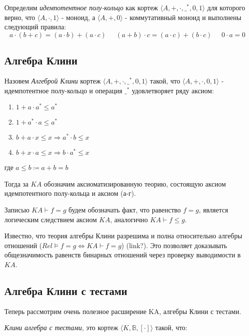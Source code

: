 \documentclass[times
              ]{itmo-student-thesis}
\begin{document}
      Определим \textit{идемпотентное полу-кольцо} как кортеж $ \langle A,+,\cdot,\_^*,0,1 \rangle$ для которого верно, что
      $ \langle A, \cdot, 1 \rangle $ - моноид,
      а $ \langle A, +, 0 \rangle $ - коммутативный моноид и выполнены следующий правила:
      $$ a \cdot (b + c) = (a \cdot b) + (a \cdot c) \;\;\;\;\;
         (a + b) \cdot c = (a \cdot c) + (b \cdot c) \;\;\;\;\;
         0 \cdot a = 0
      $$

    \subsection{Алгебра Клини}

      Назовем \textit{Алгеброй Клини} кортеж $\langle A,+,\cdot,\_^*,0,1\rangle$ такой, что $\langle A, +, \cdot, 0, 1 \rangle$ - идемпотентное полу-кольцо и операция $ \_^* $ удовлетворяет ряду аксиом:
      \begin{enumerate}
        \item $ 1 + a \cdot a^* \leq a^* $
        \item $ 1 + a^* \cdot a \leq a^* $
        \item $ b + a \cdot x \leq x \Rightarrow a^* \cdot b \leq x $
        \item $ b + x \cdot a \leq x \Rightarrow b \cdot a^* \leq x $
      \end{enumerate}
      где  $ a \leq b \coloneqq a + b = b$

      Тогда за $ \mathit{KA} $ обозначим аксиоматизированную теорию, состоящую аксиом идемпотентного полу-кольца и аксиом (а-г).

      Записью $ \mathit{KA} \vdash f = g $ будем обозначать факт, что равенство $ f = g $, является логическим следствием аксиом $ \mathit{KA} $,
      аналогично $ \mathit{KA} \vdash f \leq g $.

      Известно, что теория алгебры Клини разрешима и полна относительно алгебры отношений
      ($ Rel \models f = g \Leftrightarrow \mathit{KA} \vdash f = g$) (link?).
      Это позволяет доказывать общезначимость равенств бинарных отношений через проверку выводимости в $ \mathit{KA} $.

    \subsection{Алгебра Клини с тестами}
      Теперь рассмотрим очень полезное расширение KA, алгебры Клини с тестами.

      \textit{Клини алгебра с тестами}, это кортеж $\langle K,\mathbb{B}, [\cdot] \rangle$ такой, что:
\end{document}
